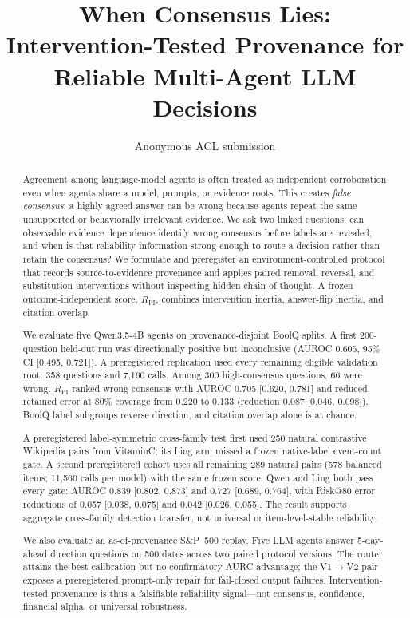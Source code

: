 \documentclass[11pt]{article}
\title{When Consensus Lies: Intervention-Tested Provenance for Reliable Multi-Agent LLM Decisions}
\author{Anonymous ACL submission}
\newcommand{\rpi}{R_{\mathrm{PI}}}
\begin{document}
\maketitle

\begin{abstract}
Agreement among language-model agents is often treated as independent corroboration even when agents share a model, prompts, or evidence roots. This creates \emph{false consensus}: a highly agreed answer can be wrong because agents repeat the same unsupported or behaviorally irrelevant evidence. We ask two linked questions: can observable evidence dependence identify wrong consensus before labels are revealed, and when is that reliability information strong enough to route a decision rather than retain the consensus? We formulate and preregister an environment-controlled protocol that records source-to-evidence provenance and applies paired removal, reversal, and substitution interventions without inspecting hidden chain-of-thought. A frozen outcome-independent score, $\rpi$, combines intervention inertia, answer-flip inertia, and citation overlap.

We evaluate five Qwen3.5-4B agents on provenance-disjoint BoolQ splits. A first 200-question held-out run was directionally positive but inconclusive (AUROC 0.605, 95\% CI [0.495, 0.721]). A preregistered replication used every remaining eligible validation root: 358 questions and 7,160 calls. Among 300 high-consensus questions, 66 were wrong. $\rpi$ ranked wrong consensus with AUROC 0.705 [0.620, 0.781] and reduced retained error at 80\% coverage from 0.220 to 0.133 (reduction 0.087 [0.046, 0.098]). BoolQ label subgroups reverse direction, and citation overlap alone is at chance.

A preregistered label-symmetric cross-family test first used 250 natural contrastive Wikipedia pairs from VitaminC; its Ling arm missed a frozen native-label event-count gate. A second preregistered cohort uses all remaining 289 natural pairs (578 balanced items; 11,560 calls per model) with the same frozen score. Qwen and Ling both pass every gate: AUROC 0.839 [0.802, 0.873] and 0.727 [0.689, 0.764], with Risk@80 error reductions of 0.057 [0.038, 0.075] and 0.042 [0.026, 0.055]. The result supports aggregate cross-family detection transfer, not universal or item-level-stable reliability.

We also evaluate an as-of-provenance S\&P~500 replay. Five LLM agents answer 5-day-ahead direction questions on 500 dates across two paired protocol versions. The router attains the best calibration but no confirmatory AURC advantage; the V1$\to$V2 pair exposes a preregistered prompt-only repair for fail-closed output failures. Intervention-tested provenance is thus a falsifiable reliability signal---not consensus, confidence, financial alpha, or universal robustness.
\end{abstract}
\end{document}
